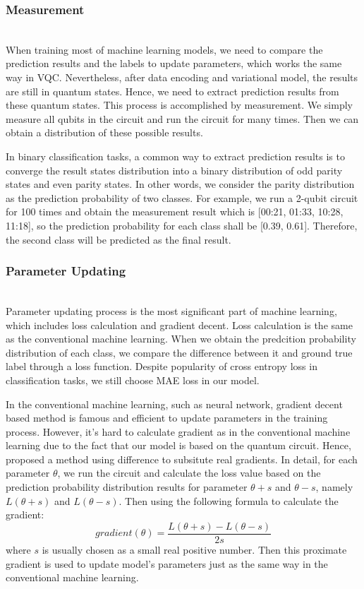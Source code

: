 \documentclass[sigconf]{acmart}
\begin{document}
\subsubsection{Measurement}\hfill\\
 When training most of machine learning models, we need to compare the prediction results and the labels to update parameters, which works the same way in VQC. Nevertheless, after data encoding and variational model, the results are still in quantum states. Hence, we need to extract prediction results from these quantum states. This process is accomplished by measurement. We simply measure all qubits in the circuit and run the circuit for many times. Then we can obtain a distribution of these possible results.
 
 In binary classification tasks, a common way to extract prediction results is to converge the result states distribution into a binary distribution of odd parity states and even parity states. In other words, we consider the parity distribution as the prediction probability of two classes. For example, we run a 2-qubit circuit for 100 times and obtain the measurement result which is [00:21, 01:33, 10:28, 11:18], so the prediction probability for each class shall be [0.39, 0.61]. Therefore, the second class will be predicted as the final result.
\subsubsection{Parameter Updating}\hfill\\
Parameter updating process is the most significant part of machine learning, which includes loss calculation and gradient decent. Loss calculation is the same as the conventional machine learning. When we obtain the predcition probability distribution of each class, we compare the difference between it and ground true label through a loss function. Despite popularity of cross entropy loss in classification tasks, we still choose MAE loss in our model.

In the conventional machine learning, such as neural network, gradient decent based method is famous and efficient to update parameters in the training process. However, it's hard to calculate gradient as in the conventional machine learning due to the fact that our model is based on the quantum circuit. Hence, \cite{schuld2020circuit} proposed a method using difference to subsitute real gradients. In detail, for each parameter $\theta$, we run the circuit and calculate the loss value based on the prediction probability distribution results for parameter $\theta+s$ and $\theta-s$, namely $L(\theta+s)$ and $L(\theta-s)$. Then using the following formula to calculate the gradient:
$$gradient(\theta)=\frac{L(\theta+s)-L(\theta-s)}{2s}$$ 
where $s$ is usually chosen as a small real positive number. Then this proximate gradient is used to update model's parameters just as the same way in the conventional machine learning.
\end{document}
